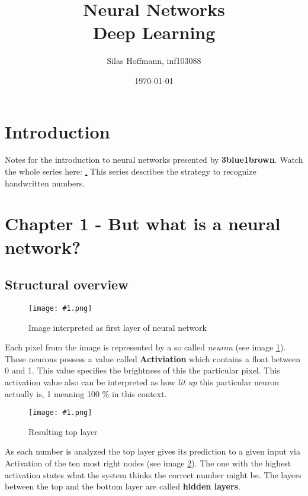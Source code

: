 \documentclass{article}
\title{%
Neural Networks \\
\large Deep Learning}
\author{Silas Hoffmann, inf103088}
\date{\today}
\newcommand{\lbl}[1]{(see image \ref{#1})}
\newcommand{\img}[1]{
	\centering
	\texttt{[image: \#1.png]}
	\label{#1}
}
\begin{document}
\maketitle

\vspace{0.5cm}
\tableofcontents
\vspace{0.5cm}
\listoffigures
\vspace{0.5cm}

\section{Introduction}
Notes for the introduction to neural networks presented by \textbf{3blue1brown}. Watch the whole series here: \href{https://www.youtube.com/watch?v=aircAruvnKk}. This series describes the strategy to recognize handwritten numbers.

\clearpage

\section{Chapter 1 - But what is a neural network?}


\subsection{Structural overview}

\FloatBarrier

\begin{figure}[h]
\img{ai_1}
\caption{Image interpreted as first layer of neural network}
\end{figure}

Each pixel from the image is represented by a so called \textit{neuron} \lbl{ai_1}. These neurons possess a value called \textbf{Activiation} which contains a float between 0 and 1. This value specifies the brightness of this the particular pixel. This activation value also can be interpreted as how \textit{lit up} this particular neuron actually is, 1 meaning 100 \% in this context.


\begin{figure}[b!]
\img{ai_2}
\caption{Resulting top layer}
\end{figure}

As each number is analyzed the top layer gives its prediction to a given input via Activation of the ten most right nodes \lbl{ai_2}. The one with the highest activation states what the system thinks the correct number might be. The layers between the top and the bottom layer are called \textbf{hidden layers}. 
\end{document}
